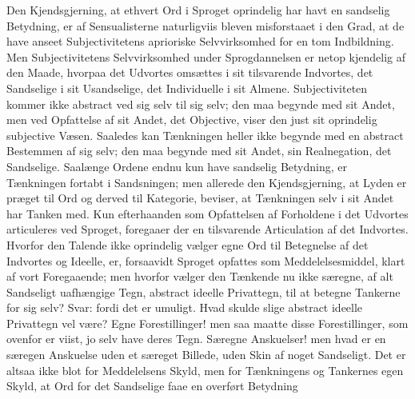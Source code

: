 \documentclass[12pt]{book}
\newcommand{\opage}[1]{\marginnote{\footnotesize\textit{[#1]}}}
\begin{document}
Den Kjendsgjerning, at ethvert Ord i Sproget oprindelig
har havt en sandselig Betydning, er af Sensualisterne
naturligviis bleven misforstaaet i den Grad, at de have anseet
Subjectivitetens aprioriske Selvvirksomhed for en tom
Indbildning. Men Subjectivitetens Selvvirksomhed under
Sprogdannelsen er netop kjendelig af den Maade, hvorpaa det
Udvortes omsættes i sit tilsvarende Indvortes, det Sandselige
i sit Usandselige, det Individuelle i sit Almene.
Subjectiviteten kommer ikke abstract ved sig selv til sig selv; den maa
begynde med sit Andet, men ved Opfattelse af sit Andet,
det Objective, viser den just sit oprindelig subjective Væsen.
Saaledes kan Tænkningen heller ikke begynde med en abstract
Bestemmen af sig selv; den maa begynde med sit Andet, sin
Realnegation, det Sandselige. Saalænge Ordene endnu kun
have sandselig Betydning, er Tænkningen fortabt i
Sandsningen; men allerede den Kjendsgjerning, at Lyden er præget
til Ord og derved til Kategorie, beviser, at Tænkningen selv
i sit Andet har Tanken med. Kun efterhaanden som
Opfattelsen af Forholdene i det Udvortes articuleres ved Sproget,
foregaaer der en tilsvarende Articulation af det Indvortes.
Hvorfor den Talende ikke oprindelig vælger egne Ord til
Betegnelse af det Indvortes og Ideelle, er, forsaavidt Sproget
opfattes som Meddelelsesmiddel, klart af vort Foregaaende; men
hvorfor vælger den Tænkende nu ikke særegne, af alt
Sandseligt uafhængige Tegn, abstract ideelle Privattegn, til at
betegne Tankerne for sig selv? Svar: fordi det er umuligt.
Hvad skulde slige abstract ideelle Privattegn vel være? Egne
Forestillinger! men saa maatte disse Forestillinger, som ovenfor
\opage{34}er viist, jo selv have deres Tegn. Særegne Anskuelser! men
hvad er en særegen Anskuelse uden et særeget Billede, uden
Skin af noget Sandseligt. Det er altsaa ikke blot for
Meddelelsens Skyld, men for Tænkningens og Tankernes egen
Skyld, at Ord for det Sandselige faae en overført Betydning
\end{document}
